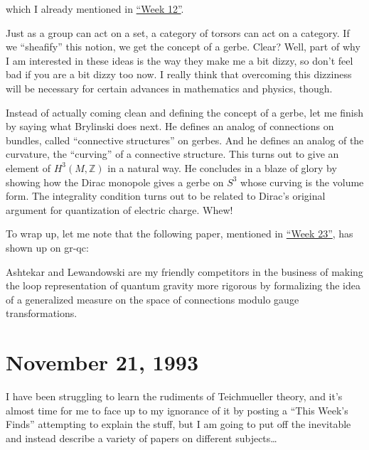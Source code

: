 \documentclass{article}
\def\tightlist{}
\renewcommand{\texttt}[1]{%
  \begingroup
  \ttfamily
  \begingroup\lccode`~=`/\lowercase{\endgroup\def~}{/\discretionary{}{}{}}%
  \begingroup\lccode`~=`[\lowercase{\endgroup\def~}{[\discretionary{}{}{}}%
  \begingroup\lccode`~=`.\lowercase{\endgroup\def~}{.\discretionary{}{}{}}%
  \catcode`/=\active\catcode`[=\active\catcode`.=\active
  \scantokens{#1\noexpand}%
  \endgroup
}
\begin{document}
which I already mentioned in \protect\hyperlink{week12}{``Week 12''}.

Just as a group can act on a set, a category of torsors can act on a
category. If we ``sheafify'' this notion, we get the concept of a gerbe.
Clear? Well, part of why I am interested in these ideas is the way they
make me a bit dizzy, so don't feel bad if you are a bit dizzy too now. I
really think that overcoming this dizziness will be necessary for
certain advances in mathematics and physics, though.

Instead of actually coming clean and defining the concept of a gerbe,
let me finish by saying what Brylinski does next. He defines an analog
of connections on bundles, called ``connective structures'' on gerbes.
And he defines an analog of the curvature, the ``curving'' of a
connective structure. This turns out to give an element of
\(H^3(M,\mathbb{Z})\) in a natural way. He concludes in a blaze of glory
by showing how the Dirac monopole gives a gerbe on \(S^3\) whose curving
is the volume form. The integrality condition turns out to be related to
Dirac's original argument for quantization of electric charge. Whew!

To wrap up, let me note that the following paper, mentioned in
\protect\hyperlink{week23}{``Week 23''}, has shown up on gr-qc:


Ashtekar and Lewandowski are my friendly competitors in the business of
making the loop representation of quantum gravity more rigorous by
formalizing the idea of a generalized measure on the space of
connections modulo gauge transformations.
\hypertarget{week26}{%
\section{November 21, 1993}\label{week26}}

I have been struggling to learn the rudiments of Teichmueller theory,
and it's almost time for me to face up to my ignorance of it by posting
a ``This Week's Finds'' attempting to explain the stuff, but I am going
to put off the inevitable and instead describe a variety of papers on
different subjects\ldots{}
\end{document}
